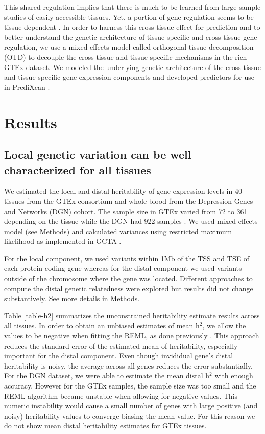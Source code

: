 \documentclass[10pt,letterpaper]{article}
\begin{document}
This shared regulation implies that there is much to be learned from large sample studies of easily accessible tissues. Yet, a portion of gene regulation seems to be tissue dependent \cite{Ardlie_2015}. In order to harness this cross-tissue effect for prediction and to better understand the genetic architecture of tissue-specific and cross-tissue gene regulation, we use a mixed effects model called orthogonal tissue decomposition (OTD) to decouple the cross-tissue and tissue-specific mechanisms in the rich GTEx dataset. We modeled the underlying genetic architecture of the cross-tissue and tissue-specific gene expression components and developed predictors for use in PrediXcan \cite{Gamazon_2015}.



\section*{Results}
\subsection*{Local genetic variation can be well characterized for all
tissues}\label{local-genetic-variation-can-be-well-characterized-for-all-tissues}

We estimated the local and distal heritability of gene expression levels in 40 tissues from the GTEx consortium and whole blood from the Depression Genes and Networks (DGN) cohort. The sample size in GTEx varied from 72 to 361 depending on the tissue while the DGN had 922 samples \cite{Battle_2013}. We used mixed-effects model (see Methods) and calculated variances using restricted maximum likelihood as implemented in GCTA \cite{Yang_2011}.

For the local component, we used variants within 1Mb of the TSS and TSE of each protein coding gene whereas for the distal component we used variants outside of the chromosome where the gene was located. Different approaches to compute the distal genetic relatedness were explored but results did not change substantively. See more details in Methods.

Table \ref{table-h2} summarizes the unconstrained heritability estimate results across all tissues. In order to obtain an unbiased estimates of mean h$^2$, we allow the values to be negative when fitting the REML, as done previously \cite{Price_2011,Wright_2014}. This approach reduces the standard error of the estimated mean of heritability, especially important for the distal component. Even though invididual gene's distal heritability is noisy, the average across all genes reduces the error substantially. For the DGN dataset, we were able to estimate the mean distal h$^2$ with enough accuracy. However for the GTEx samples, the sample size was too small and the REML algorithm became unstable when allowing for negative values. This numeric instability would cause a small number of genes with large positive (and noisy) heritability values to converge biasing the mean value. For this reason we do not show mean distal heritability estimates for GTEx tissues. 
\end{document}
